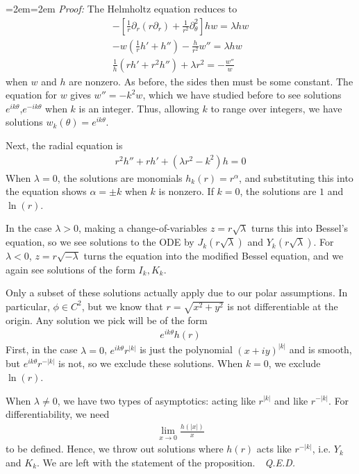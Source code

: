 \documentclass{article}
\newcommand{\pd}{\partial}
\newenvironment{pf}{%
	\par%
	\medskip
	\leftskip=2em\rightskip=2em%
	\noindent\ignorespaces \textit{Proof:} \newline}{%
	\,\, \newline \textit{Q.E.D.}\par\medskip}
\begin{document}
	\begin{pf}
		The Helmholtz equation reduces to 
		\begin{align*}
			-[\frac{1}{r} \pd_{r} ( r \pd_{r}) + \frac{1}{r^{2}} \pd_{\theta}^{2}] hw = \lambda hw \\
		-	w(\frac{1}{r} h' + h'') - \frac{h}{r^{2}} w'' = \lambda hw \\
			 \frac{1}{h}(rh' + r^{2}h'') + \lambda r^{2} = -\frac{w''}{w}
		\end{align*}
		when $w$ and $h$ are nonzero. As before, the sides then must be some constant. The equation for $w$ gives $w'' = -k^{2} w$, which we have studied before to see solutions $e^{ik \theta}$,$e^{-ik\theta}$ when $k$ is an integer. Thus, allowing $k$ to range over integers, we have solutions $w_{k}(\theta) = e^{ik\theta}$. 
		
		Next, the radial equation is 
		\begin{align*}
			r^{2}h'' + rh' + (\lambda r^{2}-k^{2})h = 0
		\end{align*}
		When $\lambda = 0$, the solutions are monomials $h_{k}(r) = r^{\alpha}$, and substituting this into the equation shows $\alpha = \pm k$ when $k$ is nonzero. If $k=0$, the solutions are $1$ and $\ln(r)$. 
		
		In the case $\lambda > 0$, making a change-of-variables $z = r \sqrt{\lambda}$ turns this into Bessel's equation, so we see solutions to the ODE by $J_k(r\sqrt{\lambda})$ and $Y_k(r\sqrt{\lambda})$. For $\lambda < 0$, $z = r\sqrt{-\lambda}$ turns the equation into the modified Bessel equation, and we again see solutions of the form $I_k,K_k$.  
		
		Only a subset of these solutions actually apply due to our polar assumptions. In particular, $\phi \in C^{2}$, but we know that $r = \sqrt{x^{2}+y^{2}}$ is not differentiable at the origin. Any solution we pick will be of the form 
		\begin{align*}
			e^{ik\theta} h(r)
		\end{align*}
		First, in the case $\lambda = 0$, $e^{i k \theta} r^{|k|}$ is just the polynomial $(x+iy)^{|k|}$ and is smooth, but $e^{i k \theta} r^{-|k|}$ is not, so we exclude these solutions. When $k=0$, we exclude $\ln(r)$. 
		
		When $\lambda \neq 0$, we have two types of asymptotics: acting like $r^{|k|}$ and like $r^{-|k|}$. For differentiability, we need
		\begin{align*}
			\lim_{x \to 0} \frac{h(|x|)}{x}
		\end{align*}
		to be defined. Hence, we throw out solutions where $h(r)$ acts like $r^{-|k|}$, i.e. $Y_k$ and $K_k$. We are left with the statement of the proposition.  
	\end{pf}
	
\end{document}
